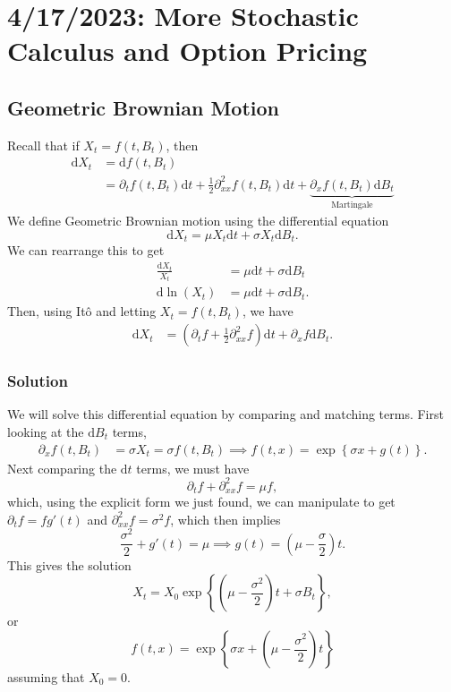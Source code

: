 \chapter{4/17/2023: More Stochastic Calculus and Option Pricing}
\section{Geometric Brownian Motion}
Recall that if $X_t = f(t,B_t)$, then \begin{align*}
	\mathrm dX_t &= \mathrm df(t,B_t) \\
				 &= \partial_t f(t,B_t)\mathrm dt + \frac{1}{2}\partial_{xx}^2 f(t,B_t)\mathrm dt + \underbrace{\partial_x f(t,B_t)\mathrm dB_t}_{\text{Martingale}}
\end{align*} We define Geometric Brownian motion using the differential equation $$ \mathrm dX_t = \mu X_t \mathrm dt + \sigma X_t \mathrm dB_t. $$ We can rearrange this to get \begin{align*}
	\frac{\mathrm dX_t}{X_t} &= \mu\mathrm dt + \sigma\mathrm dB_t \\
	\mathrm d\ln(X_t) &= \mu\mathrm dt + \sigma\mathrm dB_t.
\end{align*} Then, using It\^{o} and letting $X_t = f(t,B_t)$, we have \begin{align*}
	\mathrm dX_t &= \left( \partial_t f + \frac{1}{2}\partial_{xx}^2 f \right) \mathrm dt + \partial_x f\mathrm dB_t.
\end{align*} 
\subsection{Solution}
We will solve this differential equation by comparing and matching terms. First looking at the $\mathrm dB_t$ terms, \begin{align*}
	\partial_x f(t,B_t) &= \sigma X_t = \sigma f(t,B_t) 
	\implies f(t,x) = \exp \left\{ \sigma x + g(t) \right\}.
\end{align*} Next comparing the $\mathrm dt$ terms, we must have $$ \partial_t f + \partial_{xx}^2 f = \mu f, $$ which, using the explicit form we just found, we can manipulate to get $\partial_t f = f g'(t)$ and $\partial_{xx}^2 f = \sigma^2 f$, which then implies $$ \frac{\sigma^2}{2} + g'(t) = \mu \implies g(t) = \left(\mu-\frac{\sigma}{2}\right)t. $$ This gives the solution $$ X_t = X_0 \exp \left\{ \left( \mu-\frac{\sigma^2}{2} \right) t + \sigma B_t \right\}, $$ or $$ f(t,x) = \exp \left\{ \sigma x + \left( \mu-\frac{\sigma^2}{2} \right) t \right\} $$ assuming that $X_0 = 0$.

